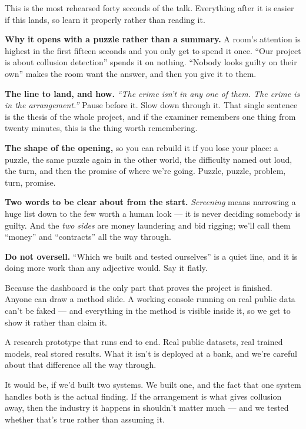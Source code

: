 \documentclass[11pt]{article}
\begin{document}
\begin{means}
This is the most rehearsed forty seconds of the talk. Everything after it is
easier if this lands, so learn it properly rather than reading it.

\textbf{Why it opens with a puzzle rather than a summary.} A room's attention is
highest in the first fifteen seconds and you only get to spend it once.
``Our project is about collusion detection'' spends it on nothing. ``Nobody
looks guilty on their own'' makes the room want the answer, and then you give
it to them.

\textbf{The line to land, and how.} \emph{``The crime isn't in any one of them.
The crime is in the arrangement.''} Pause before it. Slow down through it. That
single sentence is the thesis of the whole project, and if the examiner
remembers one thing from twenty minutes, this is the thing worth remembering.

\textbf{The shape of the opening,} so you can rebuild it if you lose your
place: a puzzle, the same puzzle again in the other world, the difficulty named
out loud, the turn, and then the promise of where we're going. Puzzle, puzzle,
problem, turn, promise.

\textbf{Two words to be clear about from the start.} \emph{Screening} means
narrowing a huge list down to the few worth a human look --- it is never
deciding somebody is guilty. And the \emph{two sides} are money laundering and
bid rigging; we'll call them ``money'' and ``contracts'' all the way through.

\textbf{Do not oversell.} ``Which we built and tested ourselves'' is a quiet
line, and it is doing more work than any adjective would. Say it flatly.
\end{means}

\begin{asked}
 Because the dashboard
is the only part that proves the project is finished. Anyone can draw a method
slide. A working console running on real public data can't be faked --- and
everything in the method is visible inside it, so we get to show it rather than
claim it.

 A research prototype that runs end to
end. Real public datasets, real trained models, real stored results. What it
isn't is deployed at a bank, and we're careful about that difference all the way
through.

 It
would be, if we'd built two systems. We built one, and the fact that one system
handles both is the actual finding. If the arrangement is what gives collusion
away, then the industry it happens in shouldn't matter much --- and we tested
whether that's true rather than assuming it.
\end{asked}
\end{document}

